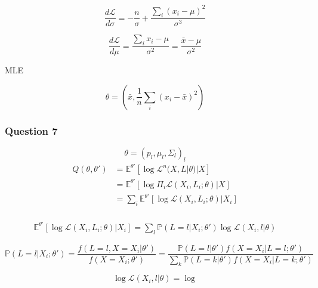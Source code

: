 \documentclass[12pt]{article}
\newcommand{\Q}[1]{\subsubsection*{Question #1}}
\begin{document}
$$\frac{d \mathcal{L}}{d \sigma} = -\frac{n}{\sigma} + \frac{\sum_i (x_i-\mu)^2}{\sigma^3}$$

$$\frac{d \mathcal{L}}{d \mu} = \frac{\sum_i x_i-\mu}{\sigma^2} = \frac{\bar x - \mu}{\sigma^2}$$

MLE

$$\theta = (\bar x, \frac1n \sum_i (x_i - \bar x)^2)$$

\Q{7}
$$\theta = (p_l, \mu_l, \Sigma_l)_l$$
\begin{align}
Q(\theta, \theta') &= \mathbb{E}^{\theta'}[ \log\mathcal{L}^n(X, L | \theta) | X] \\
&= \mathbb{E}^{\theta'}[ \log\Pi_i \mathcal{L}(X_i, L_i; \theta) | X] \\
&= \sum_i \mathbb{E}^{\theta'}[ \log\mathcal{L}(X_i, L_i; \theta) | X_i] \\
\end{align}


\begin{align}
\mathbb{E}^{\theta'}[ \log\mathcal{L}(X_i, L_i; \theta) | X_i] = \sum_l \mathbb{P}(L = l | X_i; \theta') \log \mathcal{L}(X_i, l| \theta)
\end{align}


$$\mathbb{P}(L = l | X_i; \theta') = \frac{f(L = l , X=X_i| \theta')}{f(X=X_i; \theta')} =  \frac{ \mathbb{P}(L = l|\theta')  f(X=X_i| L = l; \theta')}{\sum_k \mathbb{P}(L = k|\theta') f(X=X_i| L = k; \theta')}$$

$$\log \mathcal{L}(X_i, l| \theta) = \log $$
\end{document}

